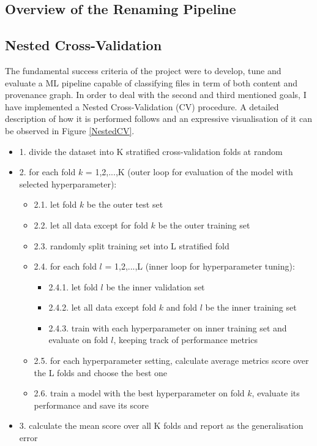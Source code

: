 \subsection{Overview of the Renaming Pipeline}

\subsection{Nested Cross-Validation}

The fundamental success criteria of the project were to develop, tune and evaluate a ML pipeline capable of classifying files in term of both content and provenance graph. In order to deal with the second and third mentioned goals, I have implemented a Nested Cross-Validation (CV) procedure. A detailed description of how it is performed follows and an expressive visualisation of it can be observed in Figure \ref{NestedCV}. \bigskip

\begin{itemize}[label={}]
  \item 1. divide the dataset into K stratified cross-validation folds at random
  \item 2. for each fold $k$ = 1,2,...,K (outer loop for evaluation of the model with selected hyperparameter):
        \begin{itemize}[label={}]
          \item 2.1. let fold $k$ be the outer test set
          \item 2.2. let all data except for fold $k$ be the outer training set
          \item 2.3. randomly split training set into L stratified fold
          \item 2.4. for each fold $l$ = 1,2,...,L (inner loop for hyperparameter tuning):
                \begin{itemize}[label={}]
                  \item 2.4.1. let fold $l$ be the inner validation set
                  \item 2.4.2. let all data except fold $k$ and fold $l$ be the inner training set
                  \item 2.4.3. train with each hyperparameter on inner training set and evaluate on fold $l$, keeping track of performance metrics
                \end{itemize}
          \item 2.5. for each hyperparameter setting, calculate average metrics score over the L folds and choose the best one
          \item 2.6. train a model with the best hyperparameter on fold $k$, evaluate its performance and save its score
        \end{itemize}
  \item 3. calculate the mean score over all K folds and report as the generalisation error
\end{itemize} \bigskip

